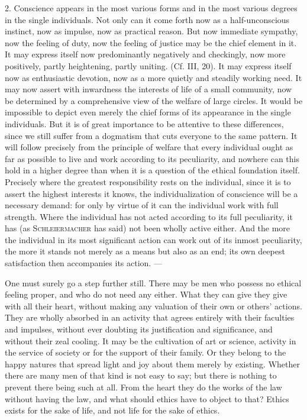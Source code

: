 \documentclass[12pt,a4paper,openany]{book}
\newcommand{\opage}[1]{\marginnote{\footnotesize\textit{[#1]}}}
\begin{document}
2. Conscience appears in the most various forms and in the most various degrees in the single
individuals. Not only can it come forth now as a half-unconscious instinct, now as impulse, now as
practical reason. But now immediate sympathy, now the feeling of duty, now the feeling of justice may be
the chief element in it. It may express itself now predominantly negatively and checkingly, now more
positively, partly heightening, partly uniting. (Cf. III, 20). It may express itself now as enthusiastic
devotion, now as a more quietly and steadily working need. It may now assert with inwardness the
interests of life of a small community, now be determined by a comprehensive view of the welfare of large
circles. It would be impossible to depict even merely the chief forms of its appearance in the single
\opage{88}individuals. But it is of great importance to be attentive to these differences, since we still
suffer from a dogmatism that cuts everyone to the same pattern. It will follow precisely from the
principle of welfare that every individual ought as far as possible to live and work according to its
peculiarity, and nowhere can this hold in a higher degree than when it is a question of the ethical
foundation itself. Precisely where the greatest responsibility rests on the individual, since it is to
assert the highest interests it knows, the individualization of conscience will be a necessary demand:
for only by virtue of it can the individual work with full strength. Where the individual has not acted
according to its full peculiarity, it has (as \textsc{Schleiermacher} has said) not been wholly active
either. And the more the individual in its most significant action can work out of its inmost
peculiarity, the more it stands not merely as a means but also as an end; its own deepest satisfaction
then accompanies its action. ---

One must surely go a step further still. There may be men who possess no ethical feeling proper, and
who do not need any either. What they can give they give with all their heart, without making any
valuation of their own or others' actions. They are wholly absorbed in an activity that agrees entirely
with their faculties and impulses, without ever doubting its justification and significance, and without
their zeal cooling. It may be the cultivation of art or science, activity in the service of society or
for the support of their family. Or they belong to the happy natures that spread light and joy about
them merely by existing. Whether there are many men of that kind is not easy to say; but there is
nothing to prevent there being such at all. From the heart they do the works of the law without having
the law, and what should ethics have to object to that? Ethics exists for the sake of life, and not life
for the sake of ethics.
\end{document}

